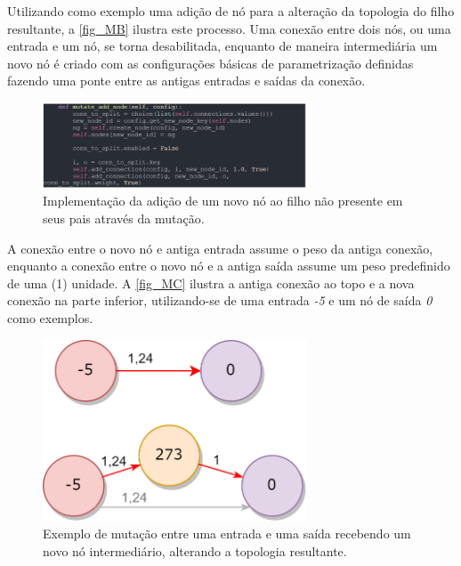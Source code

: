 Utilizando como exemplo uma adição de nó para a alteração da topologia do
filho resultante, a \autoref{fig_MB} ilustra este processo. Uma conexão entre dois nós,
ou uma entrada e um nó, se torna desabilitada, enquanto de maneira intermediária um novo
nó é criado com as configurações básicas de parametrização definidas fazendo uma ponte
entre as antigas entradas e saídas da conexão.

\begin{figure}[htb]
        \centering
        \caption{\label{fig_MB}Implementação da adição de um novo nó ao filho não presente em seus pais através da mutação.}
        \includegraphics[width=0.7\textwidth]{images/MB.png}
\end{figure}

A conexão entre o novo nó e antiga entrada assume o peso da antiga conexão, enquanto a
conexão entre o novo nó e a antiga saída assume um peso predefinido de uma (1) unidade.
A \autoref{fig_MC} ilustra a antiga conexão ao topo e a nova conexão na parte inferior,
utilizando-se de uma entrada \textit{-5} e um nó de saída \textit{0} como exemplos.

\begin{figure}[htb]
        \centering
        \caption{\label{fig_MC}Exemplo de mutação entre uma entrada e uma saída recebendo um novo nó intermediário, alterando a topologia resultante.}
        \includegraphics[width=0.7\textwidth]{images/MC.png}
\end{figure}

